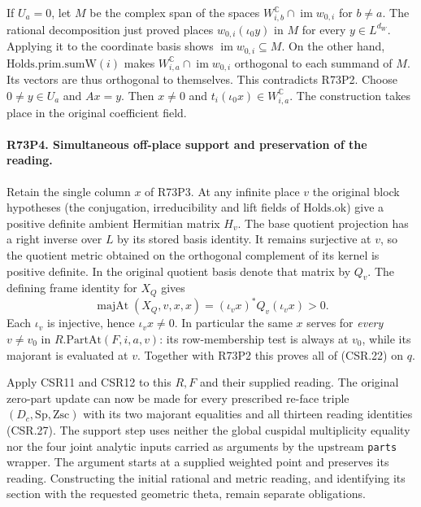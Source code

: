 If $U_a=0$, let $M$ be the complex span of the spaces
$W_{i,b}^{\mathbb C}\cap\operatorname{im}w_{0,i}$ for $b\ne a$.
The rational decomposition just proved places $w_{0,i}(\iota_0y)$
in $M$ for every $y\in L^{d_W}$. Applying it to the coordinate basis
shows $\operatorname{im}w_{0,i}\subseteq M$. On the other hand,
$\mathrm{Holds}.\mathrm{prim}.\mathrm{sumW}(i)$ makes
$W_{i,a}^{\mathbb C}\cap\operatorname{im}w_{0,i}$ orthogonal to
each summand of $M$. Its vectors are thus orthogonal to themselves.
This contradicts R73P2. Choose $0\ne y\in U_a$ and $Ax=y$.
Then $x\ne0$ and $t_i(\iota_0 x)\in W_{i,a}^{\mathbb C}$.
The construction takes place in the original coefficient field.

\paragraph{R73P4. Simultaneous off-place support and preservation of the reading.}
\label{claim:R73P4}
Retain the single column $x$ of R73P3. At any infinite place $v$ the
original block hypotheses (the conjugation, irreducibility and lift
fields of $\mathrm{Holds}.\mathrm{ok}$) give a positive definite
ambient Hermitian matrix $H_v$. The base quotient projection has a
right inverse over $L$ by its stored basis identity. It remains
surjective at $v$, so the quotient metric obtained on the orthogonal
complement of its kernel is positive definite. In the original
quotient basis denote that matrix by $Q_v$. The defining frame identity
for $X_Q$ gives
\[
   \operatorname{majAt}(X_Q,v,x,x)=(\iota_vx)^*Q_v(\iota_vx)>0.
\]
Each $\iota_v$ is injective, hence $\iota_vx\ne0$. In particular the
same $x$ serves for \emph{every} $v\ne v_0$ in
$R.\mathrm{PartAt}(F,i,a,v)$: its row-membership test is always
at $v_0$, while its majorant is evaluated at $v$.
Together with R73P2 this proves all of (CSR.22) on $q$.

Apply CSR11 and CSR12 to this $R,F$ and their supplied reading.
The original zero-part update can now be made for every prescribed
re-face triple $(D_c,\mathrm{Sp},\mathrm{Zsc})$ with its two majorant
equalities and all thirteen reading identities (CSR.27).
The support step uses neither the global cuspidal multiplicity equality
nor the four joint analytic inputs carried as arguments by the upstream
\texttt{parts} wrapper. The argument starts at a supplied weighted
point and preserves its reading. Constructing the initial rational and
metric reading, and identifying its section with the requested
geometric theta, remain separate obligations.

